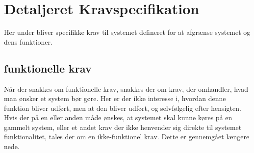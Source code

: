 \section{Detaljeret Kravspecifikation}
Her under bliver specifikke krav til systemet defineret for at afgrænse systemet og dens funktioner.
\subsection{funktionelle krav}
Når der snakkes om funktionelle krav, snakkes der om krav, der omhandler, hvad man ønsker et system bør gøre. Her er der ikke interesse i, hvordan denne funktion bliver udført, men at den bliver udført, og selvfølgelig efter hensigten. Hvis der på en eller anden måde ønskes, at systemet skal kunne køres på en gammelt system, eller et andet krav der ikke henvender sig direkte til systemet funktionalitet, tales der om en ikke-funktionel krav. Dette er gennemgået længere nede.
\newline

